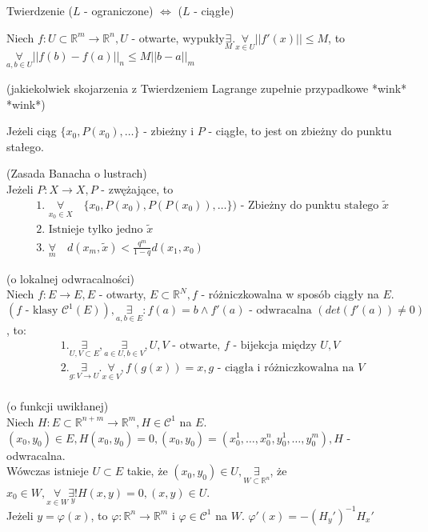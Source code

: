 \documentclass{article}
\begin{document}
\begin{tw}
    Twierdzenie ($L$ - ograniczone) $\iff$ ($L$ - ciągłe)\end{tw}
    \begin{stw}
        Niech $f: U\subset \mathbb{R}^m \to \mathbb{R}^n, U$ - otwarte, wypukły$\underset{M}{\exists}.\underset{x\in U}{\forall}||f'(x)||\leq M$, to $\underset{a,b\in U}{\forall}||f(b)-f(a)||_n \leq M||b-a||_m$ \begin{tiny}(jakiekolwiek skojarzenia z Twierdzeniem Lagrange zupełnie przypadkowe *wink* *wink*)\end{tiny}\end{stw}
    \begin{tw}
        Jeżeli ciąg $\{x_0, P(x_0), \dots \} $ - zbieżny i $P$ - ciągłe, to jest on zbieżny do punktu stałego.\end{tw}
        \begin{tw}
            (Zasada Banacha o lustrach)\\Jeżeli $P: X \to X, P$ - zwężające, to\begin{align}\label{eq:banach}&\text{1. } \underset{x_0 \in X}{\forall}\quad \{x_0,P(x_0),P(P(x_0)),\dots\}) \text{ - Zbieżny do punktu stałego } \tilde x\\&\text{2. Istnieje tylko jedno }\tilde x\\&\text{3. } \underset{m}{\forall}\quad d(x_m,\tilde x) < \frac{q^m}{1-q} d(x_1, x_0)\end{align}\end{tw}
\begin{tw}
    (o lokalnej odwracalności)\\Niech $f: E \to E, E$ - otwarty, $E\subset \mathbb{R}^N, f$ - różniczkowalna w sposób ciągły na $E$.$(f \text{ - klasy } \mathcal{C}^1 (E)), \underset{a,b\in E}{\exists}:f(a) = b \land f'(a) \text{ - odwracalna } (det(f'(a))\neq 0)$, to:\begin{align*}&1. \underset{U,V\subset E}{\exists}, \underset{a\in U, b\in V}{\exists}, U,V \text{ - otwarte, }f \text{ - bijekcja między } U,V\\&2. \underset{g: V\to U}{\exists}.\underset{x\in V}{\forall}, f(g(x)) = x, g\text{ - ciągła i różniczkowalna na } V\\\end{align*}\end{tw}
\begin{tw}
(o funkcji uwikłanej)\\Niech $H:E\subset\mathbb{R}^{n+m}\to\mathbb{R}^{m},H\in\mathcal{C}^{1}$ na $E$. $(x_0,y_0)\in E, H(x_0,y_0)=0, (x_0,y_0) = (x_0^1,\ldots,x_0^n,y_0^1,\ldots,y_0^m), H$ - odwracalna.\\Wówczas istnieje  $U\subset E$ takie, że $(x_0,y_0)\in U, \underset{W\subset \mathbb{R}^{n}}{\exists} $, że $x_0\in W, \underset{x\in W}{\forall} \underset{y}{\exists !} H(x,y) = 0, (x,y) \in U$.\\Jeżeli $y= \varphi(x)$, to $\varphi:\mathbb{R}^{n}\to\mathbb{R}^{m}$ i $\varphi\in \mathcal{C}^{1}$ na $W$. $\varphi'(x) = -(H_y')^{-1}H_x'$\end{tw}
\end{document}
